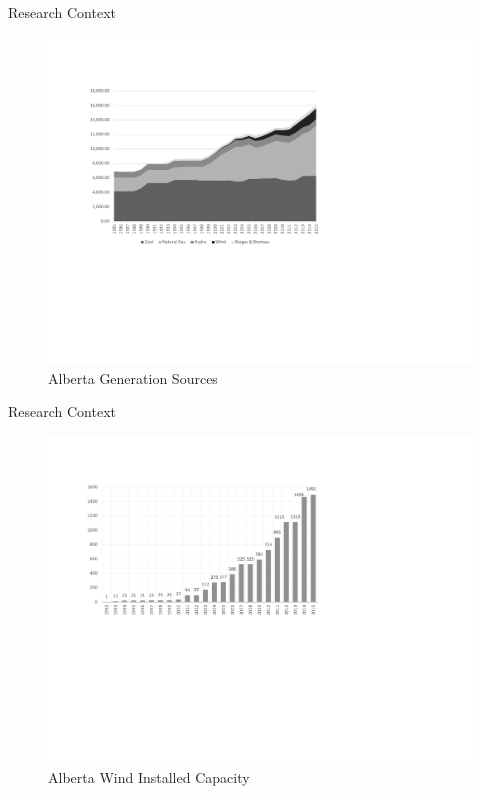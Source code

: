 \documentclass[newPxFont,numfooter,progressbar,sectionpages]{beamer}
\begin{document}

\begin{frame}[c]{Research Context}


\begin{figure}
	\centering
	\includegraphics[width=0.9\linewidth]{"figure/abEnSourcem"}
	\caption{Alberta Generation Sources}
	\label{fig:abensource}
\end{figure}



\end{frame}



\begin{frame}[c]{Research Context}


\begin{figure}
	\centering
	\includegraphics[width=0.9\linewidth]{"figure/abwindcapacitym"}
	\caption{Alberta Wind Installed Capacity}
	\label{fig:abensource}
\end{figure}



\end{frame}
\end{document}

